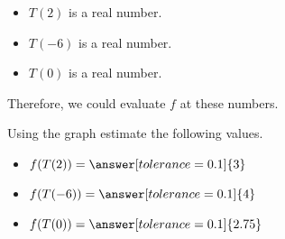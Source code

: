 \documentclass{ximera}
\begin{document}
\begin{itemize}
\item $T(2)$ is a real number.  
\item $T(-6)$ is a real number. 
\item $T(0)$ is a real number.  
\end{itemize}


Therefore, we could evaluate $f$ at these numbers.


\begin{question}


Using the graph estimate the following values.


\begin{itemize}

\item $f(T(2)) = \answer[tolerance=0.1]{3}$ \\

\item $f(T(-6)) = \answer[tolerance=0.1]{4}$ \\

\item $f(T(0)) = \answer[tolerance=0.1]{2.75}$ \\

\end{itemize}


\end{question}
\end{document}
